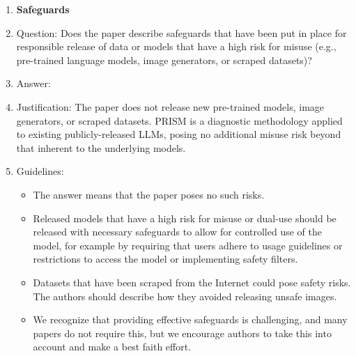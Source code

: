 \begin{enumerate}
\item {\bf Safeguards}
    \item[] Question: Does the paper describe safeguards that have been put in place for responsible release of data or models that have a high risk for misuse (e.g., pre-trained language models, image generators, or scraped datasets)?
    \item[] Answer: \answerNA{}
    \item[] Justification: The paper does not release new pre-trained models, image generators, or scraped datasets. PRISM is a diagnostic methodology applied to existing publicly-released LLMs, posing no additional misuse risk beyond that inherent to the underlying models.
    \item[] Guidelines:
    \begin{itemize}
        \item The answer \answerNA{} means that the paper poses no such risks.
        \item Released models that have a high risk for misuse or dual-use should be released with necessary safeguards to allow for controlled use of the model, for example by requiring that users adhere to usage guidelines or restrictions to access the model or implementing safety filters.
        \item Datasets that have been scraped from the Internet could pose safety risks. The authors should describe how they avoided releasing unsafe images.
        \item We recognize that providing effective safeguards is challenging, and many papers do not require this, but we encourage authors to take this into account and make a best faith effort.
    \end{itemize}


\end{enumerate}
